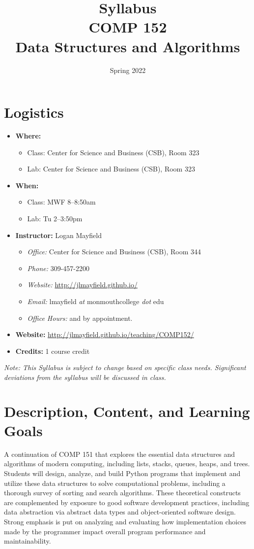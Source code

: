 \documentclass[10pt]{article}
\title{Syllabus \\ COMP 152 \\ Data Structures and Algorithms}
\author{  }
\date{Spring 2022}
\begin{document}
\maketitle

\section{Logistics}
\begin{itemize}
\item \textbf{Where: }
\begin{itemize}
\item Class: Center for Science and Business (CSB), Room 323
\item Lab: Center for Science and Business (CSB), Room 323
\end{itemize}
\item \textbf{When: }
\begin{itemize}
  \item Class: MWF 8--8:50am
  \item Lab: Tu 2--3:50pm
\end{itemize}
\item \textbf{Instructor: } Logan Mayfield
\begin{itemize}
\item \textit{Office: } Center for Science and Business (CSB), Room 344
\item \textit{Phone: } 309-457-2200 %
\item \textit{Website: } \url{http://jlmayfield.github.io/}
\item \textit{Email: } lmayfield \textit{at} monmouthcollege \textit{dot} edu
\item \textit{Office Hours: }  and by appointment.
\end{itemize}
\item \textbf{Website: } \url{http://jlmayfield.github.io/teaching/COMP152/}
\item \textbf{Credits: } 1 course credit
\end{itemize}
\emph{Note: This Syllabus is subject to change based on specific class needs. Significant deviations from the syllabus will be discussed in class.}


\section{Description, Content, and Learning Goals}

A continuation of COMP 151 that explores the essential data structures
and algorithms of modern computing, including lists, stacks, queues,
heaps, and trees. Students will design, analyze, and build Python
programs that implement and utilize these data structures to solve
computational problems, including a thorough survey of sorting and
search algorithms. These theoretical constructs are complemented by
exposure to good software development practices, including data
abstraction via abstract data types and object-oriented software
design. Strong emphasis is put on analyzing and evaluating how
implementation choices made by the programmer impact overall program
performance and maintainability.
\end{document}
